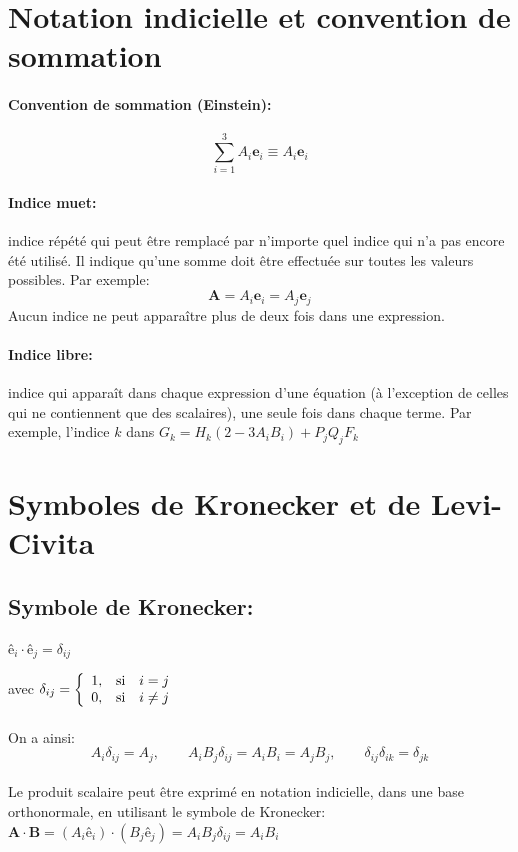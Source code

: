 \section{Notation indicielle et convention de sommation}
\paragraph{Convention de sommation (Einstein):} $$\sum_{i=1}^3 A_i\textbf{e}_i \equiv A_i\textbf{e}_i$$
\paragraph{Indice muet:} indice répété qui peut être remplacé par n'importe quel indice qui n'a pas encore été utilisé. Il indique qu'une somme doit être effectuée sur toutes les valeurs possibles. Par exemple: $$\textbf{A}=A_i\textbf{e}_i=A_j\textbf{e}_j$$
Aucun indice ne peut apparaître plus de deux fois dans une expression.
\paragraph{Indice libre:} indice qui apparaît dans chaque expression d'une équation (à l'exception de celles qui ne contiennent que des scalaires), une seule fois dans chaque terme. Par exemple, l'indice $k$ dans $G_k = H_k(2-3A_iB_i)+P_jQ_jF_k$

\section{Symboles de Kronecker et de Levi-Civita}

\subsection{Symbole de Kronecker:} $\textbf{ê}_i\cdot\textbf{ê}_j=\delta_{ij}$ 

avec $\delta_{ij}=\left\{
	\begin{array}{l c c}
		1, & \text{si} & i=j\\
		0, & \text{si} & i\neq j\\
	\end{array}\right.$
\paragraph{} On a ainsi: $$A_i\delta_{ij}=A_j, \qquad A_iB_j\delta_{ij}=A_iB_i=A_jB_j, \qquad \delta_{ij}\delta_{ik}=\delta_{jk}$$

\paragraph{} Le produit scalaire peut être exprimé en notation indicielle, dans une base orthonormale, en utilisant le symbole de Kronecker: $\textbf{A}\cdot\textbf{B}=(A_i\textbf{ê}_i)\cdot(B_j\textbf{ê}_j) = A_iB_j\delta_{ij}=A_iB_i$

